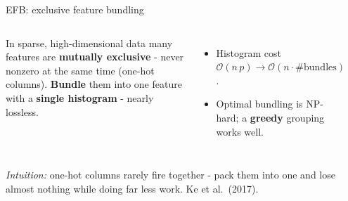 \documentclass[aspectratio=169]{beamer}
\begin{document}
\begin{frame}{EFB: exclusive feature bundling}
  \begin{columns}[T]
    In sparse, high-dimensional data many features are \textbf{mutually exclusive} - never
    nonzero at the same time (one-hot columns).
    \vskip 3pt
    \textbf{Bundle} them into one feature with a \textbf{single histogram} - nearly lossless.
    \begin{itemize}\small
      \item Histogram cost $\mathcal{O}(n\,p) \to \mathcal{O}(n \cdot \#\text{bundles})$.
      \item Optimal bundling is NP-hard; a \textbf{greedy} grouping works well.
    \end{itemize}
    \begin{center}
    \end{center}
  \end{columns}
  \vskip 2pt
  {\footnotesize \emph{Intuition:} one-hot columns rarely fire together - pack them into one and
  lose almost nothing while doing far less work.} \hfill {\scriptsize Ke et al.\ (2017).}
\end{frame}
\end{document}
